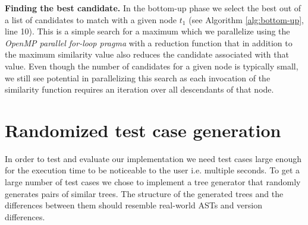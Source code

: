 \documentclass[letterpaper]{article}
\newcommand{\mypar}[1]{{\bf #1.}}
\begin{document}
\mypar{Finding the best candidate}
In the bottom-up phase we select the best out of a list of candidates to match with a given node $t_1$ (see Algorithm \ref{alg:bottom-up}, line 10).
This is a simple search for a maximum which we parallelize using the \emph{OpenMP parallel for-loop pragma} with a reduction function that in addition to the maximum similarity value also reduces the candidate associated with that value.
Even though the number of candidates for a given node is typically small, we still see potential in parallelizing this search as each invocation of the similarity function requires an iteration over all descendants of that node.

\section{Randomized test case generation}
\label{sec:test_gen}

In order to test and evaluate our implementation we need test cases large enough for the execution time to be noticeable to the user i.e. multiple seconds.
To get a large number of test cases we chose to implement a tree generator that randomly generates pairs of similar trees.
The structure of the generated trees and the differences between them should resemble real-world ASTs and version differences.
\end{document}
